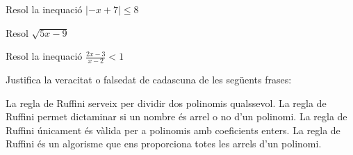 \begin{autoaval}{31}
\begin{mylist}
\exer[2]  Resol la inequació  $\left|-x+7\right|\le 8$ 

 \answers{$[-1, 15]$}
 
\exer[2]  Resol $\sqrt{5x-9}$ 
 \begin{comment}
 
   \begin{tasks}(4)
 \task {x} $<$ 9/5  \task {x} $>$ 9/5  \task {x} $\leq$ 9/5   \task {x} $\geq$  9/5 
 \end{tasks}
 \end{comment}
 
\exer[2] Resol la inequació\textbf{ $\frac{2x-3}{x-2} <1$} 
 \begin{comment}
 
   \begin{tasks}(4)
\task (1, 2)  \task ($-$$\infty$, 1)   \task \textit{x} $<$ 1 $\cup$ \textit{x} $>$ 2 \task ($-$1, 2)
 \end{tasks}
\end{comment}

		\exer[2]  Justifica la veracitat o falsedat de cadascuna de les següents frases:  
\begin{tasks}
	\task  La regla de Ruffini serveix per dividir dos polinomis qualssevol.   
	\task  La regla de Ruffini permet dictaminar si un nombre és arrel o no d'un polinomi.   
	\task  La regla de Ruffini únicament és vàlida per a polinomis amb coeficients enters.  
	\task  La regla de Ruffini és un algorisme que ens proporciona totes les arrels d'un polinomi.
\end{tasks}
\answers[cols=4]{[F, V, F, F]}

\end{mylist}
\end{autoaval}

\newpage
\resum

